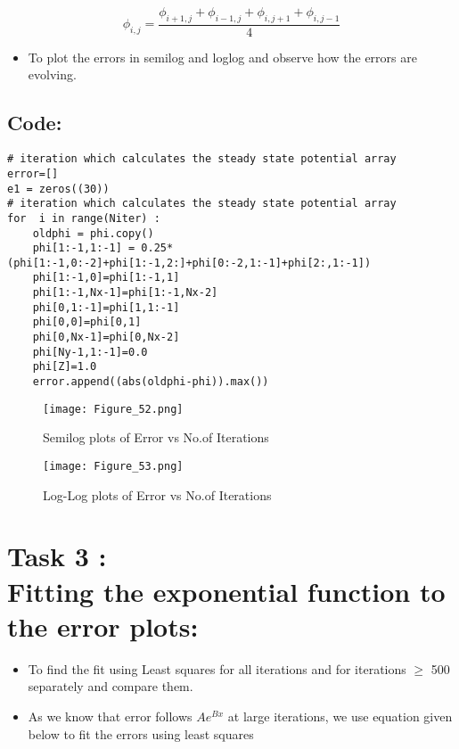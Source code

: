 \documentclass[11pt, a4paper, twoside]{article}
\begin{document}
   \begin{equation}
           \phi_{i,j} = \frac{\phi_{i+1,j} + \phi_{i-1,j} + \phi_{i,j+1} + \phi_{i,j-1}}{4} 
   \end{equation}
   
  
   \begin{itemize}
   \item
     To plot the errors in semilog and loglog and observe how the errors
     are evolving.
   \end{itemize}

\subsection*{Code:}
\begin{verbatim}
# iteration which calculates the steady state potential array
error=[]
e1 = zeros((30))
# iteration which calculates the steady state potential array
for  i in range(Niter) :
    oldphi = phi.copy()
    phi[1:-1,1:-1] = 0.25*(phi[1:-1,0:-2]+phi[1:-1,2:]+phi[0:-2,1:-1]+phi[2:,1:-1])
    phi[1:-1,0]=phi[1:-1,1]
    phi[1:-1,Nx-1]=phi[1:-1,Nx-2]
    phi[0,1:-1]=phi[1,1:-1]
    phi[0,0]=phi[0,1]
    phi[0,Nx-1]=phi[0,Nx-2]
    phi[Ny-1,1:-1]=0.0
    phi[Z]=1.0
    error.append((abs(oldphi-phi)).max())
\end{verbatim}

     \begin{figure}[!tbh]
      \centering
      \texttt{[image: Figure\_52.png]}\\
      \caption{Semilog plots of Error vs No.of Iterations}
 \end{figure}
 
  \begin{figure}[!tbh]
      \centering
      \texttt{[image: Figure\_53.png]}  
      \caption{Log-Log plots of Error vs No.of Iterations}
 \end{figure}
 
 
 \newpage
 
\section*{Task 3 :\\ Fitting the exponential function to the error plots:}

\begin{itemize}
\item
  To find the fit using Least squares for all iterations
  and for iterations \(\geq\) 500
  separately and compare them.
\item
  As we know that error follows \(Ae^{Bx}\) at large iterations, we use
  equation given below to fit the errors using least squares
\end{itemize}
\end{document}
